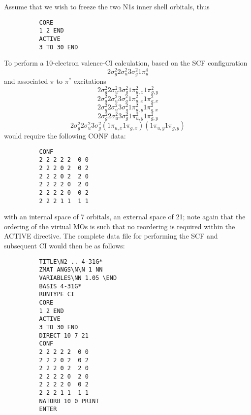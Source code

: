 \documentclass[11pt,fleqn]{article}
\begin{document}
Assume that we wish to freeze the two N1s inner shell orbitals, thus
{
\footnotesize
\begin{verbatim}
          CORE
          1 2 END
          ACTIVE
          3 TO 30 END
\end{verbatim}
}
To perform a 10-electron valence-CI calculation,
based on the SCF configuration  
\begin{equation}
 2\sigma_g^{2}  2\sigma_u^{2}  3\sigma_g^2  1\pi_u^{4}
\end{equation}
and associated $\pi$ to $\pi^{*}$ excitations
\begin{equation}
 2\sigma_g^{2}  2\sigma_u^{2}  3\sigma_g^2  1\pi_{u,x}^2 1\pi_{g,y}^2
\end{equation}
\begin{equation}
 2\sigma_g^{2}  2\sigma_u^{2}  3\sigma_g^2  1\pi_{u,x}^2 1\pi_{g,x}^2
\end{equation}
\begin{equation}
 2\sigma_g^{2}  2\sigma_u^{2}  3\sigma_g^2  1\pi_{u,y}^2 1\pi_{g,x}^2
\end{equation}
\begin{equation}
 2\sigma_g^{2}  2\sigma_u^{2}  3\sigma_g^2  1\pi_{u,y}^2 1\pi_{g,y}^2
\end{equation}
\begin{equation}
 2\sigma_g^{2}  2\sigma_u^{2}  3\sigma_g^2  (1\pi_{u,x} 1\pi_{g,x}) (1\pi_{u,y} 1\pi_{g,y})
\end{equation}
would require the following CONF data:
{
\footnotesize
\begin{verbatim}
          CONF
          2 2 2 2 2  0 0
          2 2 2 0 2  0 2
          2 2 2 0 2  2 0
          2 2 2 2 0  2 0
          2 2 2 2 0  0 2
          2 2 2 1 1  1 1
\end{verbatim}
}
with an internal space of 7 orbitals, an external space of 21; note
again that the ordering of the virtual MOs is such that
no reordering is required within the ACTIVE directive.
The complete data file for performing the
SCF and subsequent CI would then be as follows:

{
\footnotesize
\begin{verbatim}
          TITLE\N2 .. 4-31G*
          ZMAT ANGS\N\N 1 NN
          VARIABLES\NN 1.05 \END
          BASIS 4-31G*
          RUNTYPE CI
          CORE
          1 2 END
          ACTIVE
          3 TO 30 END
          DIRECT 10 7 21
          CONF
          2 2 2 2 2  0 0
          2 2 2 0 2  0 2
          2 2 2 0 2  2 0
          2 2 2 2 0  2 0
          2 2 2 2 0  0 2
          2 2 2 1 1  1 1
          NATORB 10 0 PRINT
          ENTER
\end{verbatim}
}
\end{document}
